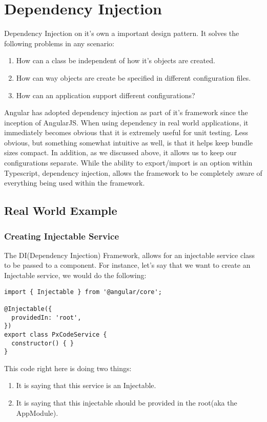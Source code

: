 \chapter{ Dependency Injection }


Dependency Injection on it's own a important design pattern. It solves the
following problems in any scenario:
\begin{enumerate}
  \item How can a class be independent of how it's objects are created.
  \item How can way objects are create be specified in different configuration
  files.
  \item How can an application support different configurations?
\end{enumerate}

Angular has adopted dependency injection as part of it's framework since the
inception of AngularJS. When using dependency in real world applications, it
immediately becomes obvious that it is extremely useful for unit testing. Less obvious, but something somewhat intuitive as well, is that it helps keep bundle
sizes compact. In addition, as we discussed above, it allows us to keep our
configurations separate. While the ability to export/import is an option within
Typescript, dependency injection, allows the framework to be completely aware
of everything being used within the framework.

\section{ Real World Example }

\subsection{ Creating Injectable Service }
The DI(Dependency Injection) Framework, allows for an injectable service class
to be passed to a component. For instance, let's say that we want to create an
Injectable service, we would do the following:
\begin{lstlisting}
import { Injectable } from '@angular/core';

@Injectable({
  providedIn: 'root',
})
export class PxCodeService {
  constructor() { }
}
\end{lstlisting}

This code right here is doing two things:
\begin{enumerate}
  \item It is saying that this service is an Injectable.
  \item It is saying that this injectable should be provided in the root(aka the
  AppModule).
\end{enumerate}

